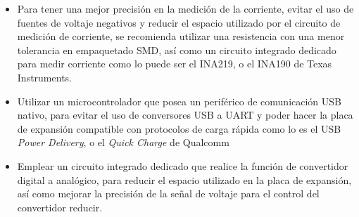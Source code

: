 \begin{itemize}
    \item Para tener una mejor precisión en la medición de la corriente, evitar el uso
    de fuentes de voltaje negativos y reducir el espacio utilizado por el
    circuito de medición de corriente,
    se recomienda utilizar una resistencia con una menor tolerancia en empaquetado SMD, así como un 
    circuito integrado dedicado para medir corriente como lo puede ser el INA219, 
    o el INA190 de Texas Instruments.

    \item Utilizar un microcontrolador que posea un periférico de comunicación USB nativo,
    para evitar el uso de conversores USB a UART y poder hacer la placa de expansión
    compatible con protocolos de carga rápida como lo es el USB \textit{Power Delivery}, o el
    \textit{Quick Charge} de Qualcomm

    \item Emplear un circuito integrado dedicado que realice la función de 
    convertidor digital a analógico, para reducir el espacio utilizado en la placa
    de expansión, así como mejorar la precisión de la señal de voltaje para el control
    del convertidor reducir.

\end{itemize}
